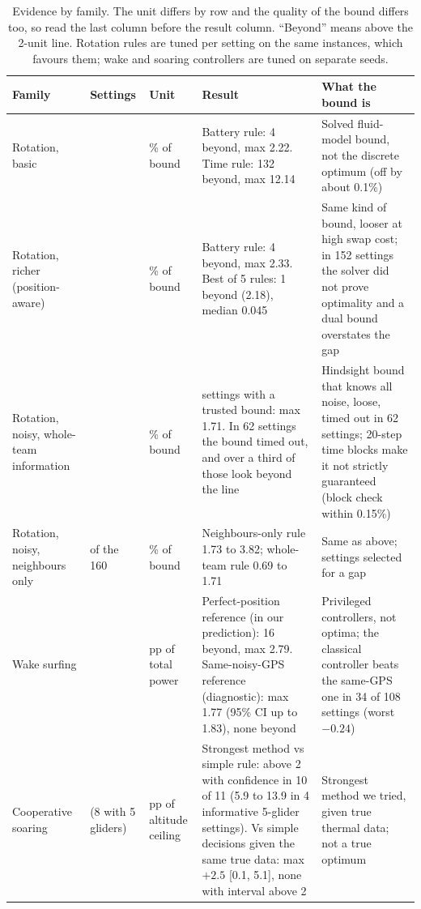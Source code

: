 \documentclass[11pt]{article}
\begin{document}
\begin{table}[t]
\centering
\footnotesize
\caption{Evidence by family. The unit differs by row and the quality of the bound differs too, so read the last column before the result column. ``Beyond'' means above the 2-unit line. Rotation rules are tuned per setting on the same instances, which favours them; wake and soaring controllers are tuned on separate seeds.}
\label{tab:evidence}
\setlength{\tabcolsep}{3.5pt}
\begin{tabular}{@{}>{\raggedright\arraybackslash}p{2.0cm}>{\raggedright\arraybackslash}p{1.2cm}>{\raggedright\arraybackslash}p{1.4cm}>{\raggedright\arraybackslash}p{5.5cm}>{\raggedright\arraybackslash}p{5.2cm}@{}}
\toprule
Family & Settings & Unit & Result & What the bound is \\
\midrule
Rotation, basic & 192 & \% of bound & Battery rule: 4 beyond, max 2.22. Time rule: 132 beyond, max 12.14 & Solved fluid-model bound, not the discrete optimum (off by about 0.1\%) \\
Rotation, richer (position-aware) & 768 & \% of bound & Battery rule: 4 beyond, max 2.33. Best of 5 rules: 1 beyond (2.18), median 0.045 & Same kind of bound, looser at high swap cost; in 152 settings the solver did not prove optimality and a dual bound overstates the gap \\
Rotation, noisy, whole-team information & 160 & \% of bound & 98 settings with a trusted bound: max 1.71. In 62 settings the bound timed out, and over a third of those look beyond the line & Hindsight bound that knows all noise, loose, timed out in 62 settings; 20-step time blocks make it not strictly guaranteed (block check within 0.15\%) \\
Rotation, noisy, neighbours only & 23 of the 160 & \% of bound & Neighbours-only rule 1.73 to 3.82; whole-team rule 0.69 to 1.71 & Same as above; settings selected for a gap \\
Wake surfing & 108 & pp of total power & Perfect-position reference (in our prediction): 16 beyond, max 2.79. Same-noisy-GPS reference (diagnostic): max 1.77 (95\% CI up to 1.83), none beyond & Privileged controllers, not optima; the classical controller beats the same-GPS one in 34 of 108 settings (worst $-0.24$) \\
Cooperative soaring & 11 (8 with 5 gliders) & pp of altitude ceiling & Strongest method vs simple rule: above 2 with confidence in 10 of 11 (5.9 to 13.9 in 4 informative 5-glider settings). Vs simple decisions given the same true data: max $+2.5$ [0.1, 5.1], none with interval above 2 & Strongest method we tried, given true thermal data; not a true optimum \\
\bottomrule
\end{tabular}
\end{table}
\end{document}
